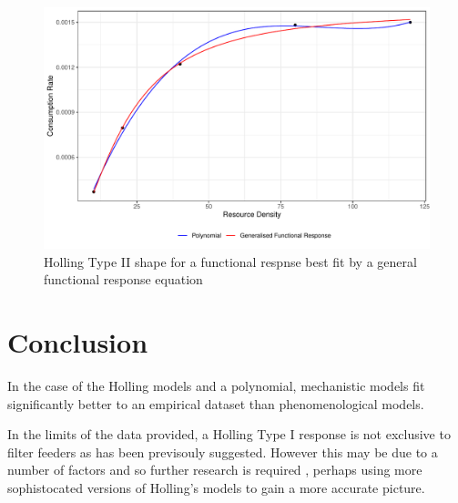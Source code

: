 \documentclass[11pt, a4paper, titlepage]{article}
\begin{document}
\begin{figure}[ht!]
	\centering\includegraphics[width=1\textwidth]{../Results/GFR_Holling2_example.pdf}
	\caption{Holling Type II shape for a functional respnse best fit by a general functional response equation}
\end{figure}

\section{Conclusion}

In the case of the Holling models and a polynomial, mechanistic models fit significantly better to an empirical dataset than phenomenological models. 

In the limits of the data provided, a Holling Type I response is not exclusive to filter feeders as has been previsouly suggested. However this may be due to a number of factors and so further research is required , perhaps using more sophistocated versions of Holling's models to gain a more accurate picture.


\newpage
\printbibliography
\end{document}
